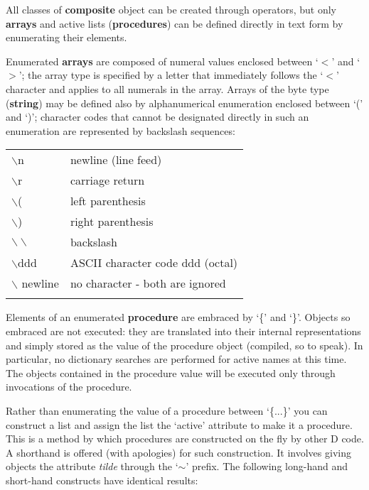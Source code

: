 All  classes of \textbf{composite} object can be created through  operators,  but only  \textbf{arrays}  and active lists (\textbf{procedures}) can be  defined  directly  in text form by enumerating their elements.

Enumerated \textbf{arrays} are  composed of numeral values enclosed between  `$<$'  and  `$>$';  the array type is specified by  a  letter that immediately follows  the  `$<$'  character and applies to all numerals in the array.  Arrays  of  the byte type (\textbf{string}) may be defined  also  by alphanumerical  enumeration enclosed between `(' and `)';  character codes  that cannot  be designated directly in such an enumeration are represented  by backslash sequences:\\

\begin{tabular}{>{\normalfont}l>{\normalfont}l}

$\backslash$n &   newline (line feed)\\
$\backslash$r &   carriage return\\
$\backslash$( &   left parenthesis\\
$\backslash$) &   right parenthesis\\
$\backslash \backslash$ &    backslash\\
$\backslash$ddd &  ASCII character code ddd (octal)\\
$\backslash$ newline & no character - both are ignored\\\\
\end{tabular}

Elements  of an enumerated \textbf{procedure} are embraced by  `\{' and `\}'.  Objects  so embraced  are  not  executed:  they are translated  into  their  internal representations  and  simply stored as the value of the  procedure  object (compiled,  so  to  speak).  In particular,  no dictionary  searches  are performed  for active names at this time.  The objects contained  in  the procedure  value  will  be  executed  only  through  invocations  of  the procedure.

Rather than enumerating the value of a procedure between `\{...\}' you can construct a list and assign the list the `active' attribute to make it a procedure. This is a method by which procedures are constructed on the fly by other D code. A shorthand is offered (with apologies) for such construction. It involves giving objects the attribute \emph{tilde} through the `$\sim$' prefix. The following long-hand and short-hand constructs have identical results:\\

